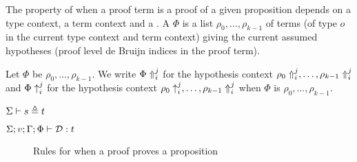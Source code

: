 The property of when a proof term is a proof of a given
proposition depends on a type context, a term context
and a {}.
A {} $\Phi$ is a list
$\rho_0,\ldots,\rho_{k-1}$
of terms (of type $o$ in the current type context
and term context)
giving the current assumed hypotheses
(proof level de Bruijn indices in the proof term).

Let $\Phi$ be $\rho_0,\ldots,\rho_{k-1}$.
We write $\dbtpsh{i}{j}\Phi$ for the hypothesis context
$\dbtpsh{i}{j}{\rho_0},\ldots,\dbtpsh{i}{j}{\rho_{k-1}}$
and $\dbsh{i}{j}\Phi$ for the hypothesis context
$\dbsh{i}{j}{\rho_0},\ldots,\dbtpsh{i}{j}{\rho_{k-1}}$
when $\Phi$ is $\rho_0,\ldots,\rho_{k-1}$.

$\Sigma\vdash s \conv t$

$\Sigma;v;\Gamma;\Phi\vdash \cD : t$

\begin{figure}
\begin{center}
\end{center}
\caption{Rules for when a proof proves a proposition}\label{fig:pf}
\end{figure}


